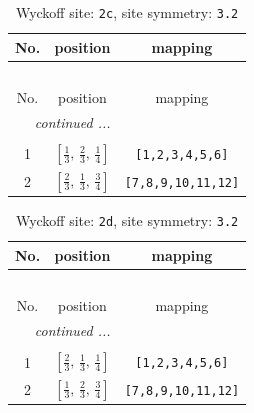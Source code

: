 \documentclass[fleqn,8pt]{jsarticle}
\begin{document}
\begin{longtable}{ccc}
\caption{Wyckoff site: {\tt 2c}, site symmetry: {\tt 3.2}}
 \\
 \hline \hline
No. & position & mapping \\ \hline \endfirsthead

\multicolumn{2}{l}{\tablename\ \thetable{}} \\
 \hline \hline
No. & position & mapping \\ \hline \endhead

 \hline \hline
\multicolumn{2}{r}{\footnotesize\it continued ...} \\ \endfoot

 \hline \hline
\multicolumn{2}{r}{} \\ \endlastfoot

1 & $\left[ \frac{1}{3},\, \frac{2}{3},\, \frac{1}{4} \right]$ & {\tt [1,2,3,4,5,6]} \\ \hline
2 & $\left[ \frac{2}{3},\, \frac{1}{3},\, \frac{3}{4} \right]$ & {\tt [7,8,9,10,11,12]} \\
\end{longtable}
\renewcommand{\arraystretch}{1.2}
\begin{longtable}{ccc}
\caption{Wyckoff site: {\tt 2d}, site symmetry: {\tt 3.2}}
 \\
 \hline \hline
No. & position & mapping \\ \hline \endfirsthead

\multicolumn{2}{l}{\tablename\ \thetable{}} \\
 \hline \hline
No. & position & mapping \\ \hline \endhead

 \hline \hline
\multicolumn{2}{r}{\footnotesize\it continued ...} \\ \endfoot

 \hline \hline
\multicolumn{2}{r}{} \\ \endlastfoot

1 & $\left[ \frac{2}{3},\, \frac{1}{3},\, \frac{1}{4} \right]$ & {\tt [1,2,3,4,5,6]} \\ \hline
2 & $\left[ \frac{1}{3},\, \frac{2}{3},\, \frac{3}{4} \right]$ & {\tt [7,8,9,10,11,12]} \\
\end{longtable}
\renewcommand{\arraystretch}{1.2}
\end{document}
